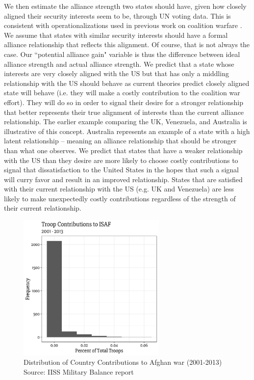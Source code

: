 \documentclass[12pt,letterpaper]{article}
\begin{document}
		We then estimate the alliance strength two states should have, given how closely aligned their security interests seem to be, through UN voting data. This is consistent with operationalizations used in previous work on coalition warfare \citep{wolford_politicsmilitarycoalitions_2015}. We assume that states with similar security interests should have a formal alliance relationship that reflects this alignment. Of course, that is not always the case. Our ``potential alliance gain" variable is thus the difference between ideal alliance strength and actual alliance strength. We predict that a state whose interests are very closely aligned with the US but that has only a middling relationship with the US should behave as current theories predict closely aligned state will behave (i.e. they will make a costly contribution to the coalition war effort). They will do so in order to signal their desire for a stronger relationship that better represents their true alignment of interests than the current alliance relationship. The earlier example comparing the UK, Venezuela, and Australia is illustrative of this concept. Australia represents an example of a state with a high latent relationship -- meaning an alliance relationship that should be stronger than what one observes. We predict that states that have a weaker relationship with the US than they desire are more likely to choose costly contributions to signal that dissatisfaction to the United States in the hopes that such a signal will curry favor and result in an improved relationship. States that are satisfied with their current relationship with the US (e.g. UK and Venezuela) are less likely to make unexpectedly costly contributions regardless of the strength of their current relationship.

		\begin{figure}[ht]
			\centering
			\includegraphics[width=0.65\textwidth]{figures/troop_dist.pdf}
			\caption{Distribution of Country Contributions to Afghan war (2001-2013) Source: IISS Military Balance report}
			\label{fig:troop_hist}
		\end{figure}
		
\end{document}
